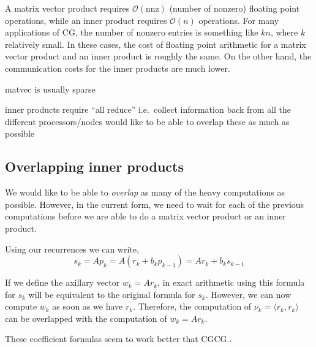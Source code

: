 A matrix vector product requires \(\mathcal{O}(\text{nnz})\) (number of
nonzero) floating point operations, while an inner product requires
\(\mathcal{O}(n)\) operations. For many applications of CG, the number
of nonzero entries is something like \(kn\), where \(k\) relatively
small. In these cases, the cost of floating point arithmetic for a
matrix vector product and an inner product is roughly the same. On the
other hand, the communication costs for the inner products are much
lower.

matvec is usually sparse

inner products require ``all reduce'' i.e.~collect information back from
all the different processors/nodes would like to be able to overlap
these as much as possible

\hypertarget{overlapping-inner-products}{%
\subsection{Overlapping inner
products}\label{overlapping-inner-products}}

We would like to be able to \emph{overlap} as many of the heavy
computations as possible. However, in the current form, we need to wait
for each of the previous computations before we are able to do a matrix
vector product or an inner product.

Using our recurrences we can write, \[
s_k = Ap_k = A(r_k + b_k p_{k-1}) 
= Ar_k + b_k s_{k-1}
\]

If we define the axillary vector \(w_k = Ar_k\), in exact arithmetic
using this formula for \(s_k\) will be equivalent to the original
formula for \(s_k\). However, we can now compute \(w_k\) as soon as we
have \(r_k\). Therefore, the computation of
\(\nu_k = \langle r_k,r_k \rangle\) can be overlapped with the
computation of \(w_k = Ar_k\).

These coefficient formulas seem to work better that CGCG..

